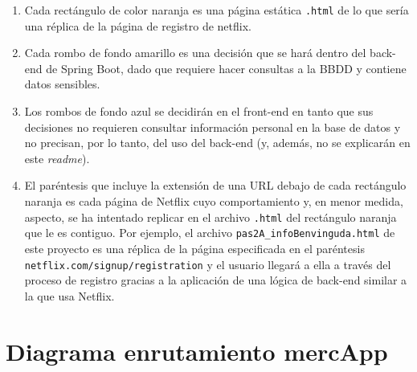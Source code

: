 \documentclass[a4paper,12pt]{report}
\begin{document}
		\begin{enumerate}
			\item Cada rectángulo de color naranja es una página estática \texttt{.html} de lo que sería una réplica de la página de registro de netflix.
			\item Cada rombo de fondo amarillo es una decisión que se hará dentro del back-end de Spring Boot, dado que requiere hacer consultas a la BBDD y contiene datos sensibles.
			\item Los rombos de fondo azul se decidirán en el front-end en tanto que sus decisiones no requieren consultar información personal en la base de datos y no precisan, por lo tanto, del uso del back-end (y, además, no se explicarán en este \textit{readme}).
			\item El paréntesis que incluye la extensión de una URL debajo de cada rectángulo naranja es cada página de Netflix cuyo comportamiento y, en menor medida, aspecto, se ha intentado replicar en el archivo \texttt{.html} del rectángulo naranja que le es contiguo. Por ejemplo, el archivo \texttt{pas2A\_infoBenvinguda.html} de este proyecto es una réplica de la página especificada en el paréntesis \texttt{netflix.com/signup/registration} y el usuario llegará a ella a través del proceso de registro gracias a la aplicación de una lógica de back-end similar a la que usa Netflix.
		\end{enumerate}

		
	

		\section{Diagrama enrutamiento mercApp}
		\label{sec:anexo_diagramaEnrutamietnoMercApp}
\end{document}
